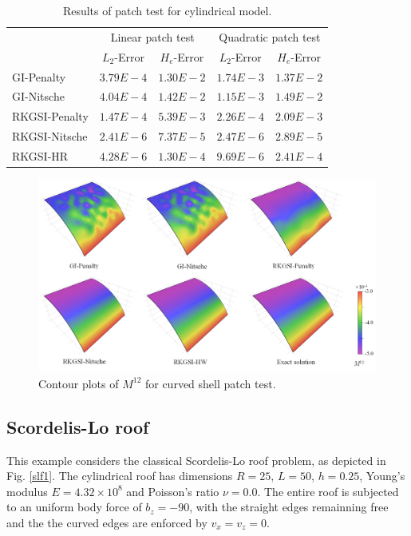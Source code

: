 \begin{table}[!ht]
\centering
\caption{Results of patch test for cylindrical model.}\label{ptt2}
\begin{tabular}{lcccc}
\toprule
 & \multicolumn{2}{c}{Linear patch test} & \multicolumn{2}{c}{Quadratic patch test} \\ \cline{2-5}
 & $L_2$-Error & $H_e$-Error & $L_2$-Error & $H_e$-Error \\
    \midrule
    GI-Penalty & $3.79E-4$ & $1.30E-2$ & $1.74E-3$ & $1.37E-2$ \\
    GI-Nitsche & $4.04E-4$ & $1.42E-2$ & $1.15E-3$ & $1.49E-2$ \\
    RKGSI-Penalty & $1.47E-4$ & $5.39E-3$ & $2.26E-4$ & $2.09E-3$ \\
    RKGSI-Nitsche & $2.41E-6$ & $7.37E-5$ & $2.47E-6$ & $2.89E-5$ \\
    RKGSI-HR & $4.28E-6$ & $1.30E-4$ & $9.69E-6$ & $2.41E-4$ \\
    \bottomrule
\end{tabular}
\end{table}

\begin{figure}[!ht]
\centering
\includegraphics[width=\textwidth]{figures/ptc}
\caption{Contour plots of $M^{12}$ for curved shell patch test.}\label{ptf2}
\end{figure}

\subsection{Scordelis-Lo roof}
This example considers the classical Scordelis-Lo roof problem, as depicted in Fig. \ref{slf1}. The cylindrical roof has dimensions $R=25$, $L=50$, $h=0.25$, Young's modulus $E=4.32\times 10^8$ and Poisson's ratio $\nu=0.0$. The entire roof is subjected to an uniform body force of $b_z = -90$, with the straight edges remainning free and the the curved edges are enforced by $v_x=v_z=0$.

